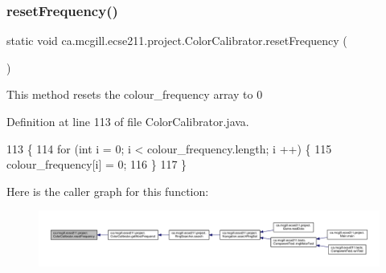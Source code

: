 \mbox{\label{classca_1_1mcgill_1_1ecse211_1_1project_1_1_color_calibrator_ab6148d75e3a105016580e90ed1ea9bc9}} 
\subsubsection{\texorpdfstring{reset\+Frequency()}{resetFrequency()}}
{\footnotesize\ttfamily static void ca.\+mcgill.\+ecse211.\+project.\+Color\+Calibrator.\+reset\+Frequency (\begin{DoxyParamCaption}{ }\end{DoxyParamCaption})\hspace{0.3cm}{\ttfamily [static]}}

This method resets the colour\+\_\+frequency array to 0 

Definition at line 113 of file Color\+Calibrator.\+java.


\begin{DoxyCode}
113                                       \{
114     \textcolor{keywordflow}{for} (\textcolor{keywordtype}{int} i = 0; i < colour\_frequency.length; i ++) \{
115       colour\_frequency[i] = 0;
116     \}
117   \}
\end{DoxyCode}
Here is the caller graph for this function\+:
\nopagebreak
\begin{figure}[H]
\begin{center}
\leavevmode
\includegraphics[width=350pt]{classca_1_1mcgill_1_1ecse211_1_1project_1_1_color_calibrator_ab6148d75e3a105016580e90ed1ea9bc9_icgraph}
\end{center}
\end{figure}
\mbox{\label{classca_1_1mcgill_1_1ecse211_1_1project_1_1_color_calibrator_a40906193773ead0bfd582f188413c97a}} 
